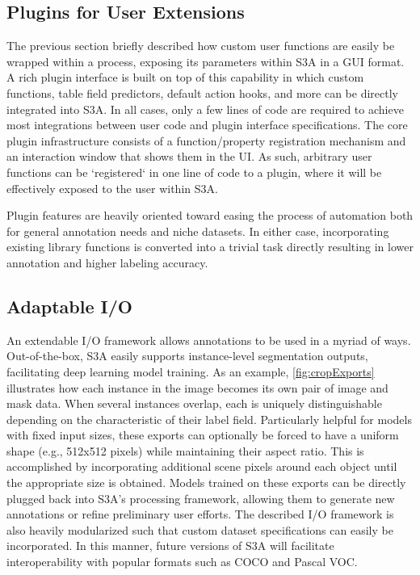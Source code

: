 \makeRegionAnalyticsFig

\subsection{Plugins for User Extensions}\label{sec:plugins}
The previous section briefly described how custom user functions are easily be wrapped within a process, exposing its parameters within S3A in a GUI format.
A rich plugin interface is built on top of this capability in which custom functions, table field predictors, default action hooks, and more can be directly integrated into S3A.
In all cases, only a few lines of code are required to achieve most integrations between user code and plugin interface specifications.
The core plugin infrastructure consists of a function/property registration mechanism and an interaction window that shows them in the UI.
As such, arbitrary user functions can be `registered` in one line of code to a plugin, where it will be effectively exposed to the user within S3A.

Plugin features are heavily oriented toward easing the process of automation both for general annotation needs and niche datasets.
In either case, incorporating existing library functions is converted into a trivial task directly resulting in lower annotation and higher labeling accuracy.

\subsection{Adaptable I/O}
An extendable I/O framework allows annotations to be used in a myriad of ways.
Out-of-the-box, S3A easily supports instance-level segmentation outputs, facilitating deep learning model training.
As an example, \autoref{fig:cropExports} illustrates how each instance in the image becomes its own pair of image and mask data.
When several instances overlap, each is uniquely distinguishable depending on the characteristic of their label field.
Particularly helpful for models with fixed input sizes, these exports can optionally be forced to have a uniform shape (e.g., 512x512 pixels) while maintaining their aspect ratio.
This is accomplished by incorporating additional scene pixels around each object until the appropriate size is obtained.
Models trained on these exports can be directly plugged back into S3A's processing framework, allowing them to generate new annotations or refine preliminary user efforts.
The described I/O framework is also heavily modularized such that custom dataset specifications can easily be incorporated.
In this manner, future versions of S3A will facilitate interoperability with popular formats such as COCO and Pascal VOC.

